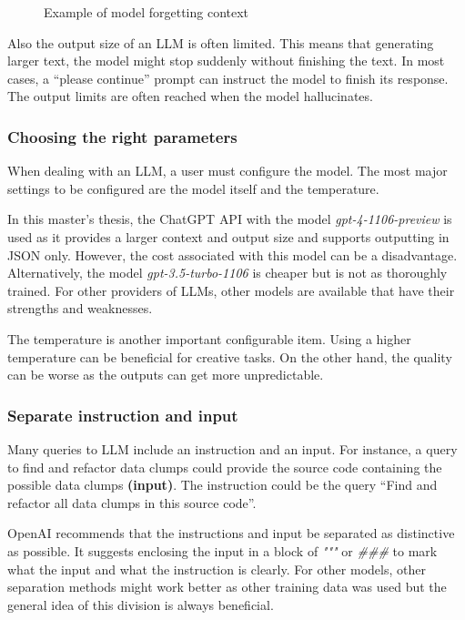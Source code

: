 {\begin{figure}[ht!]
    \centering
    
    \caption{Example of model forgetting context}
    \label{fig:llm_loose_context}
\end{figure}

Also the output size of an \ac{LLM} is often limited. This means that generating larger text, the model might stop suddenly without finishing the text. In most cases, a \enquote{please continue} prompt can instruct the model to finish its response. The output limits are often reached when the model hallucinates. 
\subsubsection{Choosing the right parameters}
When dealing with an \ac{LLM}, a user must configure the model. The most major settings to be configured are the model itself and the temperature.

In this master's thesis, the ChatGPT \ac{API} with the model \textit{gpt-4-1106-preview} is used as it provides a larger context  and output size and supports outputting in \ac{JSON} only. However, the cost associated with this model can be a disadvantage. Alternatively, the model \textit{gpt-3.5-turbo-1106} is cheaper but is not as thoroughly trained. For other providers of \acp{LLM}, other models are available that have their strengths and weaknesses.  

The temperature is another important configurable item. Using a higher temperature can be beneficial for creative tasks. On the other hand, the quality can be worse as the outputs can get more unpredictable. 




\subsubsection{Separate instruction and input}
Many queries to \ac{LLM} include an instruction and an input. For instance, a query to find and refactor data clumps could provide the source code containing the possible data clumps \textbf{(input)}. The instruction could be the query \enquote{Find and refactor all data clumps in this source code}. 

OpenAI recommends that the instructions and input be separated as distinctive as possible. It suggests enclosing the input in a block of \textit{"""} or \textit{\#\#\#} to mark what the input and what the instruction is clearly. For other models, other separation methods might work better as other training data was used but the general idea of this division is always beneficial. 

}

